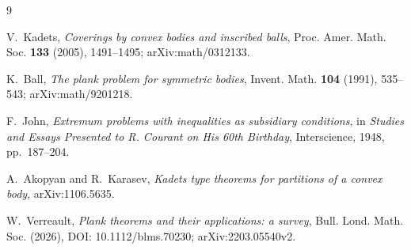 \documentclass[11pt]{article}
\theoremstyle{remark}
\begin{document}
\begin{thebibliography}{9}

V.~Kadets,
\emph{Coverings by convex bodies and inscribed balls},
Proc. Amer. Math. Soc. \textbf{133} (2005), 1491--1495;
arXiv:math/0312133.

K.~Ball,
\emph{The plank problem for symmetric bodies},
Invent. Math. \textbf{104} (1991), 535--543;
arXiv:math/9201218.

F.~John,
\emph{Extremum problems with inequalities as subsidiary conditions},
in \emph{Studies and Essays Presented to R. Courant on His 60th Birthday},
Interscience, 1948, pp.~187--204.

A.~Akopyan and R.~Karasev,
\emph{Kadets type theorems for partitions of a convex body},
arXiv:1106.5635.

W.~Verreault,
\emph{Plank theorems and their applications: a survey},
Bull. Lond. Math. Soc. (2026), DOI: 10.1112/blms.70230;
arXiv:2203.05540v2.

\end{thebibliography}
\end{document}
